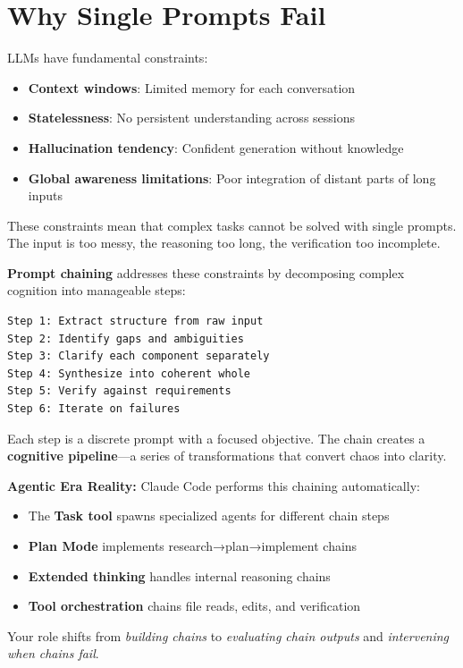 \chapter{Why Single Prompts Fail}

LLMs have fundamental constraints:

\begin{itemize}
    \item \textbf{Context windows}: Limited memory for each conversation
    \item \textbf{Statelessness}: No persistent understanding across sessions
    \item \textbf{Hallucination tendency}: Confident generation without knowledge
    \item \textbf{Global awareness limitations}: Poor integration of distant parts of long inputs
\end{itemize}

These constraints mean that complex tasks cannot be solved with single prompts. The input is too messy, the reasoning too long, the verification too incomplete.

\textbf{Prompt chaining} addresses these constraints by decomposing complex cognition into manageable steps:

\begin{lstlisting}
Step 1: Extract structure from raw input
Step 2: Identify gaps and ambiguities
Step 3: Clarify each component separately
Step 4: Synthesize into coherent whole
Step 5: Verify against requirements
Step 6: Iterate on failures
\end{lstlisting}

Each step is a discrete prompt with a focused objective. The chain creates a \textbf{cognitive pipeline}---a series of transformations that convert chaos into clarity.

\begin{quotebox}
\textbf{Agentic Era Reality:} Claude Code performs this chaining automatically:
\begin{itemize}
    \item The \textbf{Task tool} spawns specialized agents for different chain steps
    \item \textbf{Plan Mode} implements research→plan→implement chains
    \item \textbf{Extended thinking} handles internal reasoning chains
    \item \textbf{Tool orchestration} chains file reads, edits, and verification
\end{itemize}
Your role shifts from \emph{building chains} to \emph{evaluating chain outputs} and \emph{intervening when chains fail}.
\end{quotebox}
